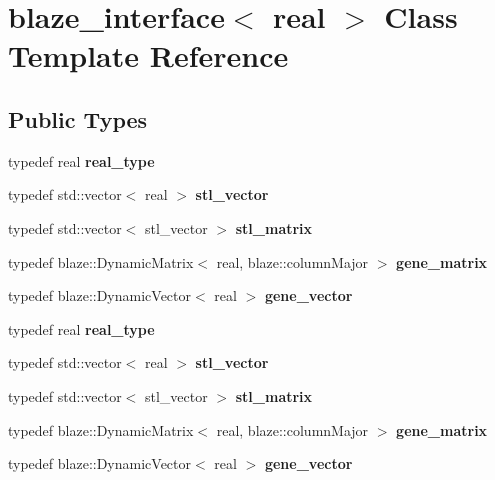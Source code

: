 \hypertarget{classblaze__interface}{}\section{blaze\+\_\+interface$<$ real $>$ Class Template Reference}
\label{classblaze__interface}
\subsection*{Public Types}
\begin{DoxyCompactItemize}
\item 
\mbox{\label{classblaze__interface_a50e405736c9e4007d7ef79a70e09e508}} 
typedef real {\bfseries real\+\_\+type}
\item 
\mbox{\label{classblaze__interface_a972372d0543430651a7789f6f605e494}} 
typedef std\+::vector$<$ real $>$ {\bfseries stl\+\_\+vector}
\item 
\mbox{\label{classblaze__interface_a1c7a06719fb6ab03b12a82f0acf54723}} 
typedef std\+::vector$<$ stl\+\_\+vector $>$ {\bfseries stl\+\_\+matrix}
\item 
\mbox{\label{classblaze__interface_a139b74aa32acd5c99448ba0f30361c95}} 
typedef blaze\+::\+Dynamic\+Matrix$<$ real, blaze\+::column\+Major $>$ {\bfseries gene\+\_\+matrix}
\item 
\mbox{\label{classblaze__interface_aa20b48da0bda26b06fee6fcf9dcf747a}} 
typedef blaze\+::\+Dynamic\+Vector$<$ real $>$ {\bfseries gene\+\_\+vector}
\item 
\mbox{\label{classblaze__interface_a50e405736c9e4007d7ef79a70e09e508}} 
typedef real {\bfseries real\+\_\+type}
\item 
\mbox{\label{classblaze__interface_a972372d0543430651a7789f6f605e494}} 
typedef std\+::vector$<$ real $>$ {\bfseries stl\+\_\+vector}
\item 
\mbox{\label{classblaze__interface_a1c7a06719fb6ab03b12a82f0acf54723}} 
typedef std\+::vector$<$ stl\+\_\+vector $>$ {\bfseries stl\+\_\+matrix}
\item 
\mbox{\label{classblaze__interface_a139b74aa32acd5c99448ba0f30361c95}} 
typedef blaze\+::\+Dynamic\+Matrix$<$ real, blaze\+::column\+Major $>$ {\bfseries gene\+\_\+matrix}
\item 
\mbox{\label{classblaze__interface_aa20b48da0bda26b06fee6fcf9dcf747a}} 
typedef blaze\+::\+Dynamic\+Vector$<$ real $>$ {\bfseries gene\+\_\+vector}
\end{DoxyCompactItemize}
